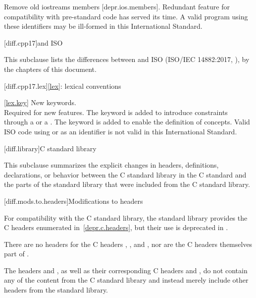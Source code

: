 \change
Remove old iostreams members [depr.ios.members].
\rationale Redundant feature for compatibility with pre-standard code
has served its time.
\effect A valid \CppXIV program using these identifiers
may be ill-formed in this International Standard.

[diff.cpp17]{\Cpp and ISO \CppXVII}

\pnum
{}%
This subclause lists the differences between \Cpp and
ISO \CppXVII (ISO/IEC 14882:2017, ),
by the chapters of this document.

[diff.cpp17.lex]{\ref{lex}: lexical conventions}

\ref{lex.key}
\change New keywords.\\
\rationale Required for new features.
The  keyword is added
to introduce constraints through a  or
a . The  keyword is
added to enable the definition of concepts.
\effect
Valid ISO \CppXVII code using  or 
as an identifier is not valid in this International Standard.

[diff.library]{C standard library}
%

\pnum
This subclause summarizes the explicit changes in headers,
definitions, declarations, or behavior between the C standard library
in the C standard and the parts of the \Cpp standard library that were
included from the C standard library.

[diff.mods.to.headers]{Modifications to headers}

\pnum
For compatibility with the C standard library,
the \Cpp standard library provides the C headers enumerated
in~\ref{depr.c.headers}, but their use is deprecated in \Cpp.

\pnum
There are no \Cpp headers for the C headers
,
,
and ,
nor are the C headers themselves part of \Cpp.

\pnum
The \Cpp headers 
and , as well
as their corresponding C headers 
and , do not contain any of the
content from the C standard library and instead merely include other headers
from the \Cpp standard library.

